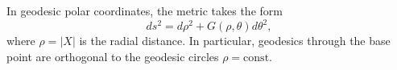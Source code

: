 In geodesic polar coordinates, the metric takes the form
$$ds^2 = d\rho^2 + G(\rho, \theta) d\theta^2,$$
where $\rho = |X|$ is the radial distance. In particular, geodesics through the base point are orthogonal to the geodesic circles $\rho = \text{const}$.